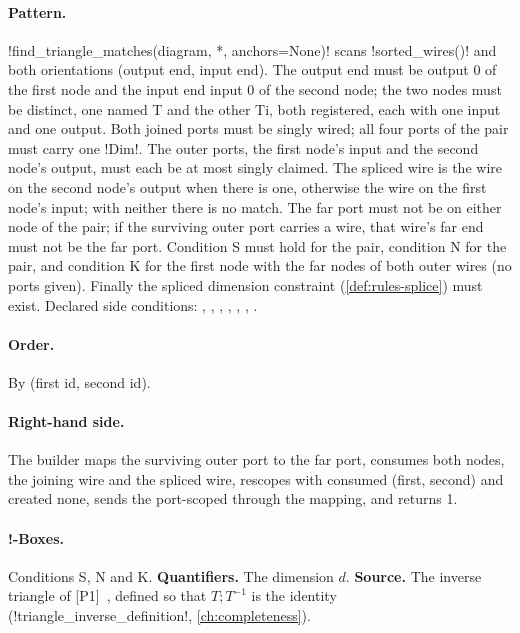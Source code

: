 \paragraph{Pattern.} \py!find_triangle_matches(diagram, *, anchors=None)! scans \py!sorted_wires()! and both orientations (output end, input end). The output end must be output 0 of the first node and the input end input 0 of the second node; the two nodes must be distinct, one named T and the other Ti, both registered, each with one input and one output. Both joined ports must be singly wired; all four ports of the pair must carry one \py!Dim!. The outer ports, the first node's input and the second node's output, must each be at most singly claimed. The spliced wire is the wire on the second node's output when there is one, otherwise the wire on the first node's input; with neither there is no match. The far port must not be on either node of the pair; if the surviving outer port carries a wire, that wire's far end must not be the far port. Condition S must hold for the pair, condition N for the pair, and condition K for the first node with the far nodes of both outer wires (no ports given). Finally the spliced dimension constraint (\cref{def:rules-splice}) must exist. Declared side conditions: , , , , , , .

\paragraph{Order.} By (first id, second id).

\paragraph{Right-hand side.} The builder maps the surviving outer port to the far port, consumes both nodes, the joining wire and the spliced wire, rescopes with consumed (first, second) and created none, sends the port-scoped \bboxes{} through the mapping, and returns 1.

\paragraph{!-Boxes.} Conditions S, N and K. \textbf{Quantifiers.} The dimension $d$. \textbf{Source.} The inverse triangle of [P1]~\cite{poor2023zxw}, defined so that $T;T^{-1}$ is the identity (\py!triangle_inverse_definition!, \cref{ch:completeness}).

